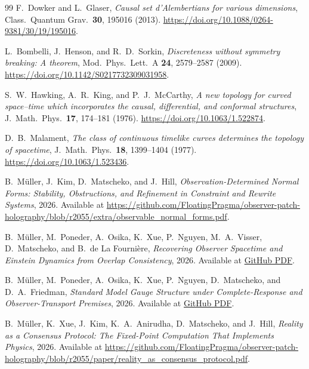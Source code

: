 \begin{thebibliography}{99}
F.~Dowker and L.~Glaser,
\emph{Causal set d'Alembertians for various dimensions},
Class.\ Quantum Grav.\ \textbf{30}, 195016 (2013).
\url{https://doi.org/10.1088/0264-9381/30/19/195016}.

L.~Bombelli, J.~Henson, and R.~D.~Sorkin,
\emph{Discreteness without symmetry breaking: A theorem},
Mod.\ Phys.\ Lett.\ A \textbf{24}, 2579--2587 (2009).
\url{https://doi.org/10.1142/S0217732309031958}.

S.~W.~Hawking, A.~R.~King, and P.~J.~McCarthy,
\emph{A new topology for curved space--time which incorporates the causal,
differential, and conformal structures},
J.\ Math.\ Phys.\ \textbf{17}, 174--181 (1976).
\url{https://doi.org/10.1063/1.522874}.

D.~B.~Malament,
\emph{The class of continuous timelike curves determines the topology of spacetime},
J.\ Math.\ Phys.\ \textbf{18}, 1399--1404 (1977).
\url{https://doi.org/10.1063/1.523436}.

B.~M\"uller, J.~Kim, D.~Matscheko, and J.~Hill,
\emph{Observation-Determined Normal Forms: Stability, Obstructions, and Refinement in Constraint
and Rewrite Systems},
2026.
Available at \url{https://github.com/FloatingPragma/observer-patch-holography/blob/r2055/extra/observable_normal_forms.pdf}.

B.~M\"uller, M.~Poneder, A.~Osika, K.~Xue, P.~Nguyen, M.~A.~Visser, D.~Matscheko, and B.~de La Fourni\`ere,
\emph{Recovering Observer Spacetime and Einstein Dynamics from Overlap Consistency},
2026.
Available at \href{https://github.com/FloatingPragma/observer-patch-holography/blob/r2055/paper/recovering_observer_spacetime_and_einstein_dynamics_from_overlap_consistency.pdf}{GitHub PDF}.

B.~M\"uller, M.~Poneder, A.~Osika, K.~Xue, P.~Nguyen, D.~Matscheko, and D.~A.~Friedman,
\emph{Standard Model Gauge Structure under Complete-Response and Observer-Transport Premises},
2026.
Available at \href{https://github.com/FloatingPragma/observer-patch-holography/blob/r2055/paper/deriving_standard_model_gauge_structure_from_observer_overlap_consistency.pdf}{GitHub PDF}.

B.~M\"uller, K.~Xue, J.~Kim, K.~A.~Anirudha, D.~Matscheko, and J.~Hill,
\emph{Reality as a Consensus Protocol: The Fixed-Point Computation That Implements Physics},
2026.
Available at \url{https://github.com/FloatingPragma/observer-patch-holography/blob/r2055/paper/reality_as_consensus_protocol.pdf}.


\end{thebibliography}
